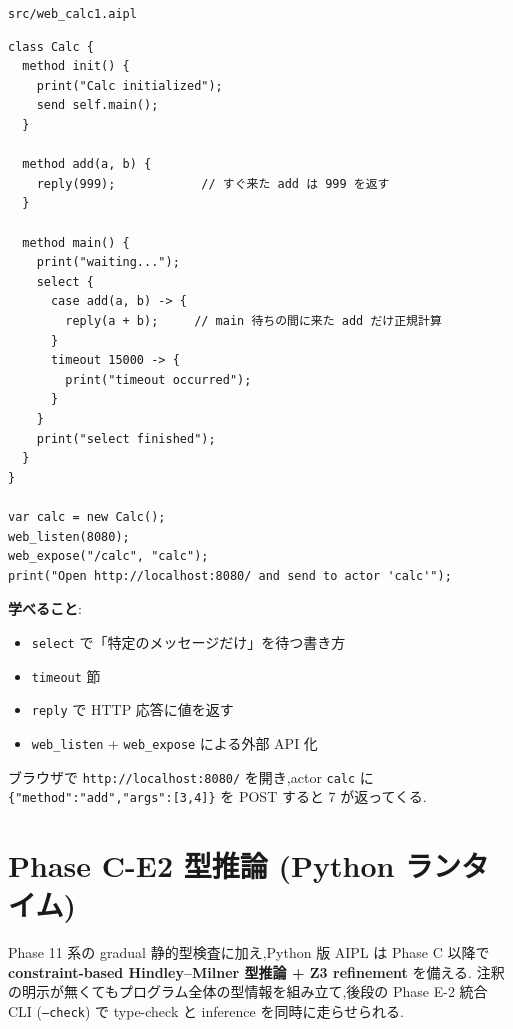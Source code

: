 \documentclass[11pt,a4paper]{article}
\begin{document}
\texttt{src/web\_calc1.aipl}

\begin{lstlisting}
class Calc {
  method init() {
    print("Calc initialized");
    send self.main();
  }

  method add(a, b) {
    reply(999);            // すぐ来た add は 999 を返す
  }

  method main() {
    print("waiting...");
    select {
      case add(a, b) -> {
        reply(a + b);     // main 待ちの間に来た add だけ正規計算
      }
      timeout 15000 -> {
        print("timeout occurred");
      }
    }
    print("select finished");
  }
}

var calc = new Calc();
web_listen(8080);
web_expose("/calc", "calc");
print("Open http://localhost:8080/ and send to actor 'calc'");
\end{lstlisting}

\textbf{学べること}:

\begin{itemize}
  \item \texttt{select} で「特定のメッセージだけ」を待つ書き方
  \item \texttt{timeout} 節
  \item \texttt{reply} で HTTP 応答に値を返す
  \item \texttt{web\_listen} + \texttt{web\_expose} による外部 API 化
\end{itemize}

ブラウザで \texttt{http://localhost:8080/} を開き,actor \texttt{calc} に
\texttt{\{"method":"add","args":[3,4]\}} を POST すると 7 が返ってくる.

\section{Phase C-E2 型推論 (Python ランタイム)}

\noindent{}


Phase 11 系の gradual 静的型検査に加え,Python 版 AIPL は Phase C 以降で
\textbf{constraint-based Hindley--Milner 型推論 + Z3 refinement} を備える.
注釈の明示が無くてもプログラム全体の型情報を組み立て,後段の Phase E-2
統合 CLI (\texttt{--check}) で type-check と inference を同時に走らせられる.
\end{document}
